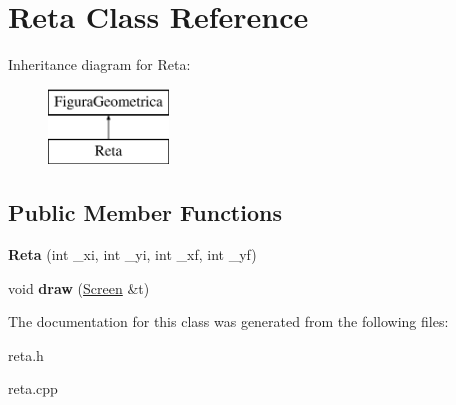\hypertarget{class_reta}{}\section{Reta Class Reference}
\label{class_reta}
Inheritance diagram for Reta\+:\begin{figure}[H]
\begin{center}
\leavevmode
\includegraphics[height=2.000000cm]{class_reta}
\end{center}
\end{figure}
\subsection*{Public Member Functions}
\begin{DoxyCompactItemize}
\item 
\mbox{\label{class_reta_aaff4f906cae4e9f8a39d7a356ab8183d}} 
{\bfseries Reta} (int \+\_\+xi, int \+\_\+yi, int \+\_\+xf, int \+\_\+yf)
\item 
\mbox{\label{class_reta_ac2e9805183cd474b62bffd8b032cd780}} 
void {\bfseries draw} (\mbox{\hyperlink{class_screen}{Screen}} \&t)
\end{DoxyCompactItemize}


The documentation for this class was generated from the following files\+:\begin{DoxyCompactItemize}
\item 
reta.\+h\item 
reta.\+cpp\end{DoxyCompactItemize}
